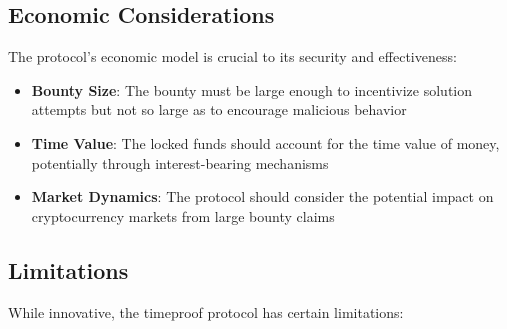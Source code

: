 \documentclass[12pt]{report}
\begin{document}
\subsection{Economic Considerations}
The protocol's economic model is crucial to its security and effectiveness:
\begin{itemize}
    \item \textbf{Bounty Size}: The bounty must be large enough to incentivize solution attempts but not so large as to encourage malicious behavior
    \item \textbf{Time Value}: The locked funds should account for the time value of money, potentially through interest-bearing mechanisms
    \item \textbf{Market Dynamics}: The protocol should consider the potential impact on cryptocurrency markets from large bounty claims
\end{itemize}

\subsection{Limitations}

While innovative, the timeproof protocol has certain limitations:
\end{document}
